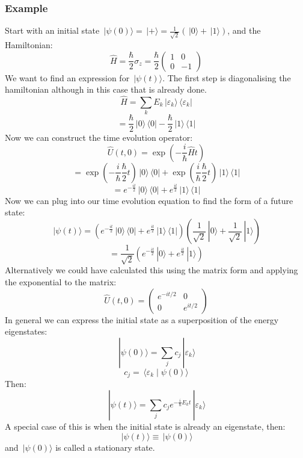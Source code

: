 \documentclass[12pt]{article}
\newcommand{\ket}[1]{\,|#1\rangle}
\newcommand{\bra}[1]{\,\langle #1|}
\newcommand{\braket}[2]{\,\langle #1\mid #2\rangle}
\begin{document}
\subsubsection*{Example}
Start with an initial state \(\ket{\psi(0)}=\ket{+}=\frac{1}{\sqrt{2}}(\ket{0}+\ket{1})\), and the Hamiltonian:
\[\hat{H}=\frac{\hbar}{2}\sigma_z=\frac{\hbar}{2}\begin{pmatrix}
    1 & 0 \\
    0 & -1
\end{pmatrix}\]
We want to find an expression for \(\ket{\psi(t)}\). The first step is diagonalising the hamiltonian although in this case that is already done.
\[\hat{H}=\sum_kE_k\ket{\varepsilon_k}\bra{\varepsilon_k}\]
\[=\frac{\hbar}{2}\ket{0}\bra{0}-\frac{\hbar}{2}\ket{1}\bra{1}\]
Now we can construct the time evolution operator:
\[\hat{U}(t,0)=\exp\left(-\frac{i}{\hbar}\hat{H}t\right)\]
\[=\exp\left(-\frac{i}{\hbar}\frac{\hbar}{2}t\right)\ket{0}\bra{0}+\exp\left(\frac{i}{\hbar}\frac{\hbar}{2}t\right)\ket{1}\bra{1}\]
\[=e^{-\frac{it}{2}}\ket{0}\bra{0}+e^{\frac{it}{2}}\ket{1}\bra{1}\]
Now we can plug into our time evolution equation to find the form of a future state:
\[\ket{\psi(t)}=\left(e^{-\frac{it}{2}}\ket{0}\bra{0}+e^{\frac{it}{2}}\ket{1}\bra{1}\right)\left(\frac{1}{\sqrt{2}}\ket{0}+\frac{1}{\sqrt{2}}\ket{1}\right)\]
\[=\frac{1}{\sqrt{2}}\left(e^{-\frac{it}{2}}\ket{0}+e^{\frac{it}{2}}\ket{1}\right)\]
Alternatively we could have calculated this using the matrix form and applying the exponential to the matrix:
\[\hat{U}(t,0)=\begin{pmatrix}
    e^{-it/2} & 0 \\
    0 & e^{it/2}
\end{pmatrix}\]
In general we can express the initial state as a superposition of the energy eigenstates:
\[\ket{\psi(0)}=\sum_jc_j\ket{\varepsilon_k}\]
\[c_j=\braket{\varepsilon_k}{\psi(0)}\]
Then:
\[\ket{\psi(t)}=\sum_jc_je^{-\frac{i}{\hbar}E_kt}\ket{\varepsilon_k}\]
A special case of this is when the initial state is already an eigenstate, then:
\[\ket{\psi(t)}\equiv\ket{\psi(0)}\]
and \(\ket{\psi(0)}\) is called a stationary state.
\end{document}

